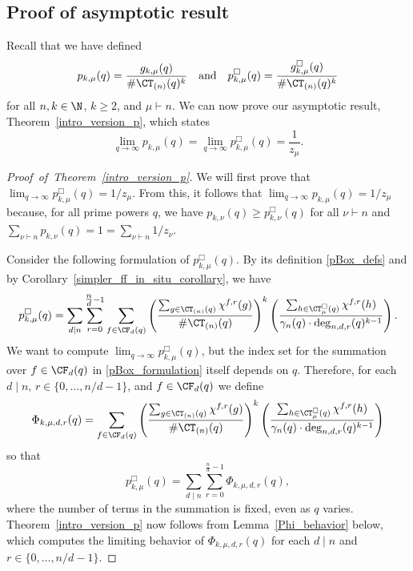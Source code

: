 \subsection{Proof of asymptotic result}

Recall that we have defined
\begin{equation}
p_{k,\mu} (q) = \frac{g_{k,\mu}(q)}{\# \CT_{(n)} (q)^k}
\quad \text{and} \quad
p_{k,\mu}^\Box (q) = \frac{g_{k,\mu}^\Box(q)}{\# \CT_{(n)} (q)^k}
\end{equation}
for all \(n,k \in \N\), \(k \geq 2\), and \(\mu \vdash n\).
We can now prove our asymptotic result, Theorem~\ref{intro_version_p}, which states
\begin{equation}
\lim_{q \to \infty}
p_{k,\mu} (q)
=
\lim_{q \to \infty}
p_{k,\mu}^\Box (q)
=
\frac{1}{z_\mu}.
\end{equation}


\begin{proof}[Proof~of~Theorem~\ref{intro_version_p}]
We will first prove that \(\lim_{q \to \infty} p_{k,\mu}^\Box (q) = 1 / z_\mu\).
From this, it follows that \(\lim_{q \to \infty} p_{k,\mu} (q) = 1 / z_\mu\) because, for all prime powers \(q\), we have \(p_{k,\nu} (q) \geq p_{k,\nu}^\Box (q)\) for all \(\nu \vdash n\) and \(\sum_{\nu \vdash n} p_{k,\nu} (q) = 1 = \sum_{\nu \vdash n} 1/z_\nu\).

Consider the following formulation of \(p_{k,\mu}^\Box (q)\).
By its definition \eqref{pBox_defs} and by Corollary~\ref{simpler_ff_in_situ_corollary}, we have
\begin{equation}
\label{pBox_formulation}
p_{k,\mu}^\Box (q) =
\sum_{d \mid n}
\sum_{r = 0}^{\tfrac{n}{d} - 1}
\sum_{f \in \CF_d (q)}
\left (
\frac{\sum_{g \in \CT_{(n)}(q)} \chi^{f,r}(g)}{\# \CT_{(n)}(q)}
\right )^k
\left (
\frac{\sum_{h \in \CT^\Box_\mu(q)} \chi^{f,r}(h)}{\gamma_n(q) \cdot \deg_{n,d,r}(q)^{k-1}}
\right ).
\end{equation}
We want to compute \(\lim_{q \to \infty} p_{k,\mu}^\Box (q)\), but the index set for the summation over \(f \in \CF_d (q)\) in \eqref{pBox_formulation} itself depends on \(q\).
Therefore, for each \(d \mid n\), \(r \in \{0,\ldots,n/d-1\}\), and \(f \in \CF_d (q)\) we define
\begin{equation}
\Phi_{k,\mu,d,r} (q)
=
\sum_{f \in \CF_d (q)}
\left (
\frac{\sum_{g \in \CT_{(n)}(q)} \chi^{f,r}(g)}{\# \CT_{(n)}(q)}
\right )^k
\left (
\frac{\sum_{h \in \CT^\Box_\mu(q)} \chi^{f,r}(h)}{\gamma_n(q) \cdot \deg_{n,d,r}(q)^{k-1}}
\right )
\end{equation}
so that
\begin{equation}
p^\Box_{k,\mu} (q)
=
\sum_{d \mid n}
\sum_{r = 0}^{\tfrac{n}{d}-1}
\Phi_{k,\mu,d,r} (q),
\end{equation}
where the number of terms in the summation is fixed, even as \(q\) varies.
Theorem~\ref{intro_version_p} now follows from Lemma~\ref{Phi_behavior} below, which computes the limiting behavior of \(\Phi_{k,\mu,d,r} (q)\) for each \(d \mid n\) and \(r \in \{0,\ldots,n/d-1\}\).
\end{proof}

